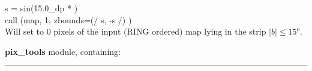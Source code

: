 \newpage
\begin{example}
{
s = sin(15.0\_dp * ) \\
call \thedocid (map, 1, zbounds=(/ s, -s /) )  \\
}
{
Will set to 0 pixels of the input (RING ordered) map lying in the strip $|b| \le 15^o$.
}
\end{example}

\begin{modules}
  \begin{sulist}{} %
  \item[\textbf{pix\_tools}] module, containing:
  \end{sulist}
\end{modules}


\rule{\hsize}{2mm}

\newpage
